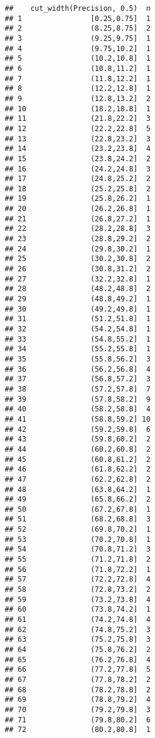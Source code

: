 \documentclass[
]{article}
\begin{document}
\begin{verbatim}
##    cut_width(Precision, 0.5)  n
## 1                [0.25,0.75]  1
## 2                (8.25,8.75]  2
## 3                (9.25,9.75]  1
## 4                (9.75,10.2]  1
## 5                (10.2,10.8]  1
## 6                (10.8,11.2]  1
## 7                (11.8,12.2]  1
## 8                (12.2,12.8]  1
## 9                (12.8,13.2]  2
## 10               (18.2,18.8]  1
## 11               (21.8,22.2]  3
## 12               (22.2,22.8]  5
## 13               (22.8,23.2]  3
## 14               (23.2,23.8]  4
## 15               (23.8,24.2]  2
## 16               (24.2,24.8]  3
## 17               (24.8,25.2]  2
## 18               (25.2,25.8]  2
## 19               (25.8,26.2]  1
## 20               (26.2,26.8]  1
## 21               (26.8,27.2]  1
## 22               (28.2,28.8]  3
## 23               (28.8,29.2]  2
## 24               (29.8,30.2]  1
## 25               (30.2,30.8]  2
## 26               (30.8,31.2]  2
## 27               (32.2,32.8]  1
## 28               (48.2,48.8]  2
## 29               (48.8,49.2]  1
## 30               (49.2,49.8]  1
## 31               (51.2,51.8]  1
## 32               (54.2,54.8]  1
## 33               (54.8,55.2]  1
## 34               (55.2,55.8]  1
## 35               (55.8,56.2]  3
## 36               (56.2,56.8]  4
## 37               (56.8,57.2]  3
## 38               (57.2,57.8]  7
## 39               (57.8,58.2]  9
## 40               (58.2,58.8]  4
## 41               (58.8,59.2] 10
## 42               (59.2,59.8]  6
## 43               (59.8,60.2]  2
## 44               (60.2,60.8]  2
## 45               (60.8,61.2]  2
## 46               (61.8,62.2]  2
## 47               (62.2,62.8]  2
## 48               (63.8,64.2]  1
## 49               (65.8,66.2]  2
## 50               (67.2,67.8]  1
## 51               (68.2,68.8]  3
## 52               (69.8,70.2]  1
## 53               (70.2,70.8]  1
## 54               (70.8,71.2]  3
## 55               (71.2,71.8]  2
## 56               (71.8,72.2]  1
## 57               (72.2,72.8]  4
## 58               (72.8,73.2]  2
## 59               (73.2,73.8]  4
## 60               (73.8,74.2]  1
## 61               (74.2,74.8]  4
## 62               (74.8,75.2]  3
## 63               (75.2,75.8]  3
## 64               (75.8,76.2]  2
## 65               (76.2,76.8]  4
## 66               (77.2,77.8]  5
## 67               (77.8,78.2]  2
## 68               (78.2,78.8]  2
## 69               (78.8,79.2]  4
## 70               (79.2,79.8]  3
## 71               (79.8,80.2]  6
## 72               (80.2,80.8]  1

\end{verbatim}
\end{document}
